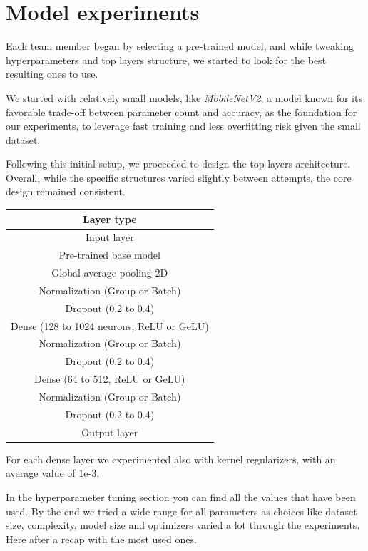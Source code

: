 \documentclass[11pt]{article}
\begin{document}
\section{Model experiments}

Each team member began by selecting a pre-trained model, and while tweaking hyperparameters and top layers structure, we started to look for the best resulting ones to use.

We started with relatively small models, like \textit{MobileNetV2}, a model known for its favorable trade-off between parameter count and accuracy, as the foundation for our experiments, to leverage fast training and less overfitting risk given the small dataset.

Following this initial setup, we proceeded to design the top layers architecture. 
Overall, while the specific structures varied slightly between attempts, the core design remained consistent.

\begin{table}[h!]
    \centering
    \begin{tabular}{|c|}
        \hline
        \textbf{Layer type} \\ \hline
        Input layer \\ \hline
        Pre-trained base model \\ \hline
        Global average pooling 2D \\ \hline
        Normalization (Group or Batch) \\ \hline
        Dropout (0.2 to 0.4) \\ \hline
        Dense (128 to 1024 neurons, ReLU or GeLU) \\ \hline
        Normalization (Group or Batch) \\ \hline
        Dropout (0.2 to 0.4) \\ \hline
        Dense (64 to 512, ReLU or GeLU) \\ \hline
        Normalization (Group or Batch) \\ \hline
        Dropout (0.2 to 0.4) \\ \hline
        Output layer \\ \hline
    \end{tabular}
\end{table}

For each dense layer we experimented also with kernel regularizers, with an average value of 1e-3.

In the hyperparameter tuning section you can find all the values that have been used. By the end we tried a wide range for all parameters as choices like dataset size, complexity, model size and optimizers varied a lot through the experiments.
Here after a recap with the most used ones.
\end{document}
